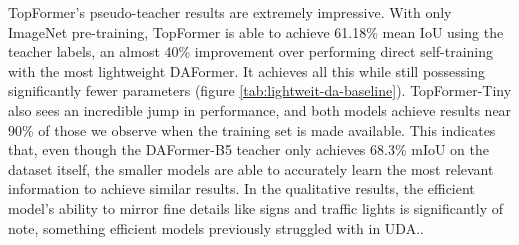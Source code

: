 \documentclass[a4paper,12pt]{report}
\begin{document}
TopFormer's pseudo-teacher results are extremely impressive. With only ImageNet pre-training, TopFormer is able to achieve 61.18\% mean IoU using the teacher labels, an almost 40\% improvement over performing direct self-training with the most lightweight DAFormer. It achieves all this while still possessing significantly fewer parameters (figure \ref{tab:lightweit-da-baseline}). TopFormer-Tiny also sees an incredible jump in performance, and both models achieve results near 90\% of those we observe when the training set is made available. This indicates that, even though the DAFormer-B5 teacher only achieves 68.3\% mIoU on the dataset itself, the smaller models are able to accurately learn the most relevant information to achieve similar results. In the qualitative results, the efficient model's ability to mirror fine details like signs and traffic lights is significantly of note, something efficient models previously struggled with in UDA..
\end{document}
